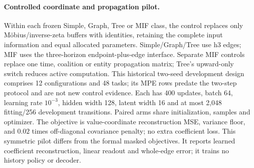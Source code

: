 \paragraph{Controlled coordinate and propagation pilot.}
\label{app:coordinatepilot}
Within each frozen Simple, Graph, Tree or MIF class, the control
replaces only M\"obius/inverse-zeta buffers with identities, retaining
the complete input information and equal allocated parameters.
Simple/Graph/Tree use h3 edges; MIF uses the three-horizon
endpoint-plus-edge interface. Separate MIF controls replace one time,
coalition or entity propagation matrix; Tree's upward-only switch
reduces active computation.
This historical two-seed development design comprises 12 configurations and 48 tasks; its MPE rows predate the two-step protocol and are not new control evidence.
Each has 400 updates, batch 64, learning rate $10^{-3}$, hidden width
128, latent width 16 and at most 2,048 fitting/256 development
transitions. Paired arms share initialization, samples and optimizer.
The objective is value-coordinate reconstruction MSE, variance floor,
and $0.02$ times off-diagonal covariance penalty; no extra coefficient
loss. This symmetric pilot differs from the formal masked objectives.
It reports learned coefficient reconstruction, linear readout and
whole-edge error; it trains no history policy or decoder.

